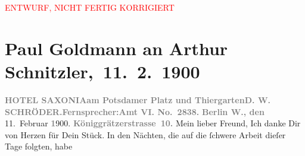 
\begin{center}
            \textcolor{red}{ENTWURF, NICHT FERTIG KORRIGIERT}
                      \end{center}
            
         
         \newcommand{\erwaehntePersonen}{Personen: Cesare Borgia, Gerhart Hauptmann, D. W. Schröder, William Shakespeare}
         \newcommand{\erwaehnteOrte}{Orte: Berlin, Bologna, Deutsches Theater Berlin, Hotel Saxonia, Potsdamer Platz, Stresemannstraße, Tiergarten, Wien}
         \newcommand{\erwaehnteWerke}{Werke: Der Schleier der Beatrice. Schauspiel in fünf Akten, Schluck und Jau}
               \section[ Paul Goldmann an Arthur Schnitzler, 11. 2. 1900]{ Paul Goldmann an Arthur Schnitzler, 11. 2. 1900}\nopagebreak{}\rehead{ }\begin{ledgroupsized}[t]{13cm}\normalsize\beginnumbering \toendnotes[C]{\smallbreak\pagebreak[2]} 
\toendnotes[C]{\smallbreak}\pstart{}{\pb}\textcolor{gray}{\textbf{\textbf{HOTEL SAXONIA}}}\pend{}\pstart{}\textcolor{gray}{\textbf{am Potsdamer Platz und
                        Thiergarten}}\pend{}\pstart{}\textcolor{gray}{\textbf{D. W. SCHRÖDER.}}\pend{}\pstart{}\textcolor{gray}{\textbf{Fernsprecher:}}\pend{}\pstart{}\textcolor{gray}{\textbf{\textbf{Amt VI. No. 2838.}}}\pend{}{\bigskip}\pstart
           \raggedleft{}\textcolor{gray}{\textbf{Berlin W., den}}{ }11. Februar \textcolor{gray}{\textbf{1}}900. \textcolor{gray}{\textbf{Königgrätzerstrasse 10.}}\pend
           \pstart{}Mein lieber Freund,\pend\pstart
           Ich danke Dir von Herzen für Dein Stück. In den Nächten, die auf die ſchwere Arbeit dieſer Tage folgten, habe

\end{ledgroupsized}
